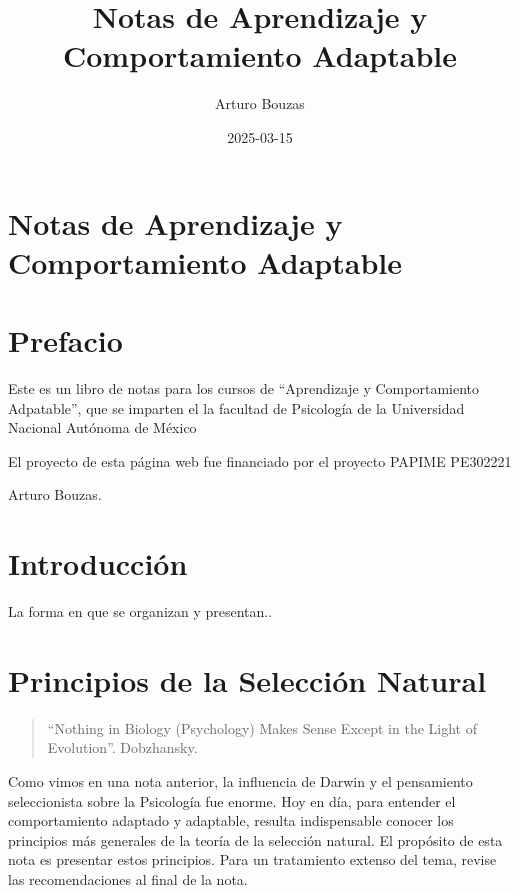 \documentclass[
  a4paper,
  DIV=11,
  numbers=noendperiod]{scrreprt}
\title{Notas de Aprendizaje y Comportamiento Adaptable}
\author{Arturo Bouzas}
\date{2025-03-15}
\renewcommand*\contentsname{Table of contents}
\newcommand\contentsname{Table of contents}
\begin{document}
\maketitle

\renewcommand*\contentsname{Table of contents}
{
\hypersetup{linkcolor=}
\setcounter{tocdepth}{2}
\tableofcontents
}

\chapter{Notas de Aprendizaje y Comportamiento
Adaptable}\label{notas-de-aprendizaje-y-comportamiento-adaptable}


\chapter*{Prefacio}\label{prefacio}


Este es un libro de notas para los cursos de ``Aprendizaje y
Comportamiento Adpatable'', que se imparten el la facultad de Psicología
de la Universidad Nacional Autónoma de México

El proyecto de esta página web fue financiado por el proyecto PAPIME
PE302221

Arturo Bouzas.


\chapter{Introducción}\label{introducciuxf3n}

La forma en que se organizan y presentan..


\chapter{Principios de la Selección
Natural}\label{principios-de-la-selecciuxf3n-natural}

\begin{quote}
``Nothing in Biology (Psychology) Makes Sense Except in the Light of
Evolution''. Dobzhansky.
\end{quote}

Como vimos en una nota anterior, la influencia de Darwin y el
pensamiento seleccionista sobre la Psicología fue enorme. Hoy en día,
para entender el comportamiento adaptado y adaptable, resulta
indispensable conocer los principios más generales de la teoría de la
selección natural. El propósito de esta nota es presentar estos
principios. Para un tratamiento extenso del tema, revise las
recomendaciones al final de la nota.
\end{document}
